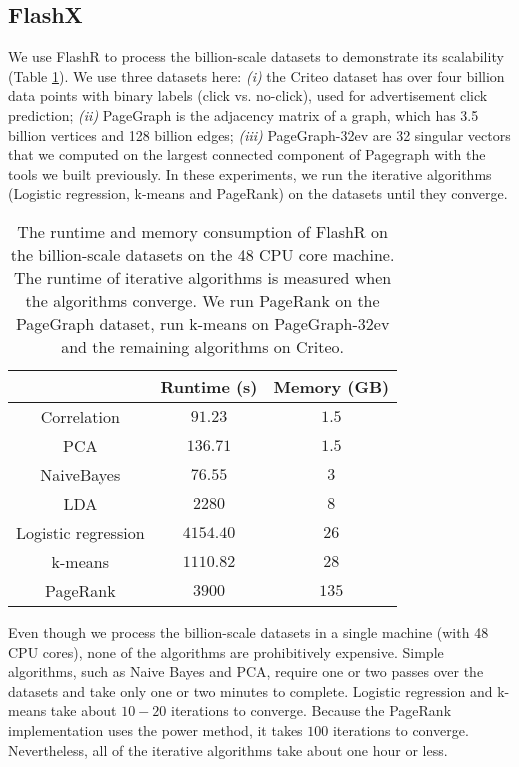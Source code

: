 \documentclass[simplex.tex]{subfiles}
\begin{document}
\subsection{FlashX}

We use FlashR to process the billion-scale datasets to demonstrate its
scalability (Table \ref{tbl:scale}). We use three datasets here: \textit{(i)}
the Criteo dataset has over four billion data points with binary labels
(click vs. no-click), used for advertisement click prediction;
\textit{(ii)} PageGraph is the adjacency matrix of a graph, which has 3.5
billion vertices and 128 billion edges;
\textit{(iii)} PageGraph-32ev are 32 singular vectors that we computed on
the largest connected component of Pagegraph with the tools we built previously.
In these experiments, we run the iterative algorithms
(Logistic regression, k-means and PageRank) on the datasets until they converge.

\begin{table}
\begin{center}
\caption{The runtime and memory consumption of FlashR on the billion-scale
		datasets on the 48 CPU core machine. The runtime of iterative
		algorithms is measured when the algorithms converge. We run PageRank
		on the PageGraph dataset, run k-means on PageGraph-32ev and the remaining
		algorithms on Criteo.}
\vspace{-10pt}
\footnotesize
\begin{tabular}{|c|c|c|}
\hline
& Runtime (s) & Memory (GB) \\
\hline
Correlation & $91.23$ & $1.5$ \\
\hline
PCA & $136.71$ & $1.5$ \\
\hline
NaiveBayes & $76.55$ & $3$ \\
\hline
LDA & $2280$ & $8$ \\
\hline
Logistic regression & $4154.40$ & $26$ \\
\hline
k-means & $1110.82$ & $28$ \\
\hline
PageRank & $3900$ & $135$ \\
\hline
\end{tabular}
\normalsize
\label{tbl:scale}
\end{center}
\vspace{-10pt}
\end{table}

Even though we process the billion-scale datasets in a single machine (with
48 CPU cores), none of
the algorithms are prohibitively expensive. Simple algorithms, such as
Naive Bayes and PCA, require one or two passes over the datasets and take
only one or two minutes to complete. Logistic regression and k-means take
about $10-20$ iterations to converge. Because the PageRank implementation
uses the power method, it takes $100$ iterations to converge.
Nevertheless, all of the iterative algorithms take about one hour or less.
\end{document}
